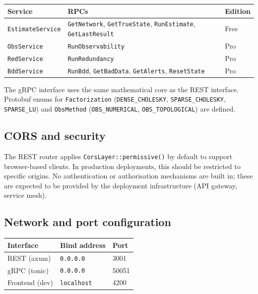 \documentclass[11pt,a4paper]{article}
\begin{document}
\begin{center}
\small
\begin{tabular}{llp{42mm}}
  \toprule
  \textbf{Service} & \textbf{RPCs} & \textbf{Edition} \\
  \midrule
  \texttt{EstimateService}
    & \texttt{GetNetwork}, \texttt{GetTrueState},
      \texttt{RunEstimate}, \texttt{GetLastResult}
    & Free \\
  \texttt{ObsService}
    & \texttt{RunObservability}
    & Pro \\
  \texttt{RedService}
    & \texttt{RunRedundancy}
    & Pro \\
  \texttt{BddService}
    & \texttt{RunBdd}, \texttt{GetBadData},
      \texttt{GetAlerts}, \texttt{ResetState}
    & Pro \\
  \bottomrule
\end{tabular}
\end{center}

\noindent
The gRPC interface uses the same mathematical core as the REST interface.
Protobuf enums for \texttt{Factorization}
(\texttt{DENSE\_CHOLESKY}, \texttt{SPARSE\_CHOLESKY}, \texttt{SPARSE\_LU})
and \texttt{ObsMethod}
(\texttt{OBS\_NUMERICAL}, \texttt{OBS\_TOPOLOGICAL}) are defined.

\subsection{CORS and security}

The REST router applies \texttt{CorsLayer::permissive()} by default to
support browser-based clients.  In production deployments, this should be
restricted to specific origins.  No authentication or authorisation
mechanisms are built in; these are expected to be provided by the
deployment infrastructure (API gateway, service mesh).

\subsection{Network and port configuration}

\begin{center}
\begin{tabular}{lll}
  \toprule
  \textbf{Interface} & \textbf{Bind address} & \textbf{Port} \\
  \midrule
  REST (axum)   & \texttt{0.0.0.0} & 3001 \\
  gRPC (tonic)  & \texttt{0.0.0.0} & 50051 \\
  Frontend (dev)& \texttt{localhost} & 4200 \\
  \bottomrule
\end{tabular}
\end{center}
\end{document}
